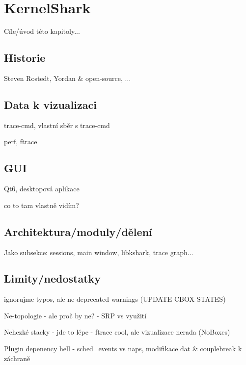 \chapter{KernelShark}

Cíle/úvod této kapitoly...

\section{Historie}

Steven Rostedt, Yordan \& open-source, ...

\section{Data k vizualizaci}
trace-cmd, vlastní sběr s trace-cmd

perf, ftrace

\section{GUI}

Qt6, desktopová aplikace

co to tam vlastně vidím?

\section{Architektura/moduly/dělení}

Jako subsekce: sessions, main window, libkshark, trace graph...

\section{Limity/nedostatky}

ignorujme typos, ale ne deprecated warnings (UPDATE CBOX STATES)

Ne-topologie - ale proč by ne?
- SRP vs využití

Nehezké stacky - jde to lépe
- ftrace cool, ale vizualizace nerada (NoBoxes)

Plugin depenency hell - sched\_events vs naps, modifikace dat \& couplebreak k záchraně
